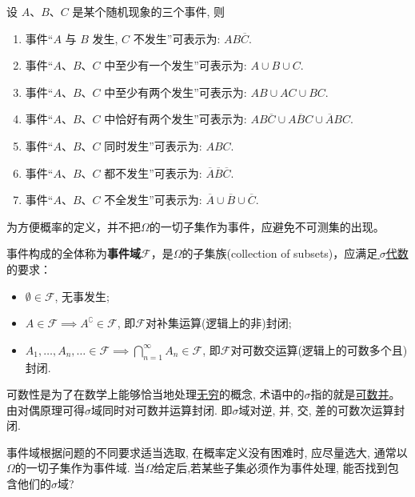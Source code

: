 \begin{example}
    设 $A$、$B$、$C$ 是某个随机现象的三个事件,
    则
    \begin{enumerate}
        \item 事件“$A$ 与 $B$ 发生,
              $C$ 不发生”可表示为: $AB\overline{C}$.
        \item 事件“$A$、$B$、$C$ 中至少有一个发生”可表示为: $A \cup B \cup C$.
        \item 事件“$A$、$B$、$C$ 中至少有两个发生”可表示为: $AB \cup AC \cup BC$.
        \item 事件“$A$、$B$、$C$ 中恰好有两个发生”可表示为: $AB\overline{C} \cup A\overline{B}C \cup \overline{A}BC$.
        \item 事件“$A$、$B$、$C$ 同时发生”可表示为: $ABC$.
        \item 事件“$A$、$B$、$C$ 都不发生”可表示为: $\overline{A}\overline{B}\overline{C}$.
        \item 事件“$A$、$B$、$C$ 不全发生”可表示为: $\overline{A} \cup \overline{B} \cup \overline{C}$.
    \end{enumerate}
\end{example}

为方便概率的定义，并不把$\Omega$的一切子集作为事件，应避免不可测集的出现。

\begin{definition}[事件域]
    事件构成的全体称为\textbf{事件域}$\mathscr{F}$，是$\Omega$的子集族(collection of subsets)，应满足\underline{\,$\sigma$代数}的要求：
    \begin{itemize}
        \item $\emptyset \in \mathscr{F}$, 无事发生;
        \item $A\in\mathscr{F} \implies A^{\complement}\in\mathscr{F}$, 即$\mathscr{F}$对补集运算(逻辑上的非)封闭;
        \item $A_{1},\dots,A_{n},\ldots \in \mathscr{F} \implies \bigcap_{n=1}^{\infty}A_{n} \in \mathscr{F}$, 即$\mathscr{F}$对可数交运算(逻辑上的可数多个且)封闭.
    \end{itemize}
\end{definition}

\begin{note}
    可数性是为了在数学上能够恰当地处理\underline{无穷}的概念, 术语中的$\sigma$指的就是\underline{可数并}。由对偶原理可得$\sigma$域同时对可数并运算封闭. 即$\sigma$域对逆, 并, 交, 差的可数次运算封闭.
\end{note}

事件域根据问题的不同要求适当选取, 在概率定义没有困难时, 应尽量选大, 通常以$\Omega$的一切子集作为事件域. 当$\Omega$给定后,若某些子集必须作为事件处理, 能否找到包含他们的$\sigma$域?

